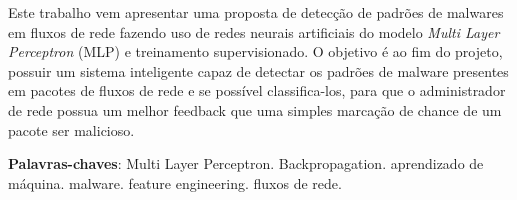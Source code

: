 \begin{resumo}

 Este trabalho vem apresentar uma proposta de detecção de padrões de malwares em fluxos de rede fazendo uso de redes neurais artificiais do modelo \textit{Multi Layer Perceptron} (MLP) e treinamento supervisionado. O objetivo é ao fim do projeto, possuir um sistema inteligente capaz de detectar os padrões de malware presentes em pacotes de fluxos de rede e se possível classifica-los, para que o administrador de rede possua um melhor feedback que uma simples marcação de chance de um pacote ser malicioso.

 \vspace{\onelineskip}

 \noindent
 \textbf{Palavras-chaves}: Multi Layer Perceptron. Backpropagation. aprendizado de máquina. malware. feature engineering. fluxos de rede.
\end{resumo}
